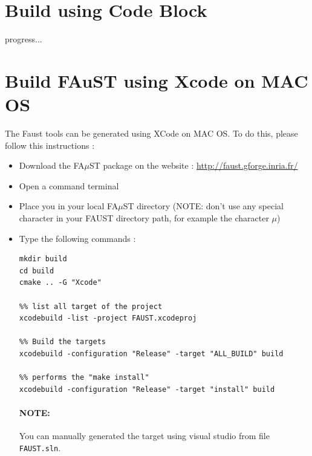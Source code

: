 \section{Build using Code Block}\label{sec:UnixInstallCodeBlock}
progress...

\section{Build FAuST using Xcode on MAC OS}\label{sec:MacInstallXcode}

The Faust tools can be generated using XCode on MAC OS. To do this, please follow this instructions :
\begin{itemize}
\item Download the FA$\mu$ST package on the website :  \url{http://faust.gforge.inria.fr/}
\item Open a command terminal
\item Place you in your local FA$\mu$ST directory (NOTE: don't use any special character in your FAUST directory path, for example the character $\mu$)
\item Type the following commands : 
\begin{lstlisting}
mkdir build
cd build
cmake .. -G "Xcode"

%% list all target of the project
xcodebuild -list -project FAUST.xcodeproj 

%% Build the targets
xcodebuild -configuration "Release" -target "ALL_BUILD" build 

%% performs the "make install"
xcodebuild -configuration "Release" -target "install" build 
\end{lstlisting}

\paragraph{NOTE:}You can manually generated the target using visual studio from file \texttt{FAUST.sln}.

 
\end{itemize} 
